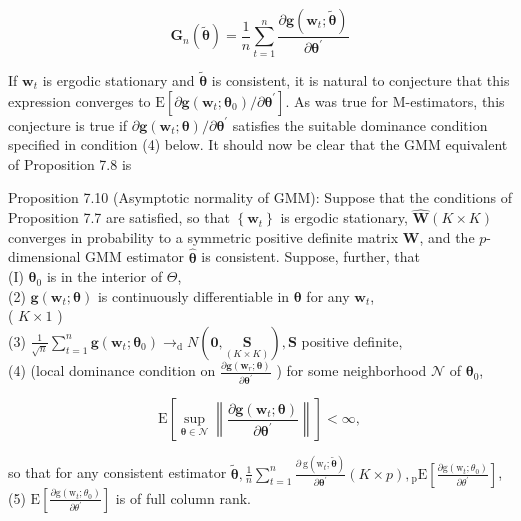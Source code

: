 \documentclass[10pt]{article}
\begin{document}
\begin{equation*}
\mathbf{G}_{n}(\tilde{\boldsymbol{\theta}})=\frac{1}{n} \sum_{t=1}^{n} \frac{\partial \mathbf{g}\left(\mathbf{w}_{t} ; \tilde{\boldsymbol{\theta}}\right)}{\partial \boldsymbol{\theta}^{\prime}} \tag{7.3.33}
\end{equation*}


If $\mathbf{w}_{t}$ is ergodic stationary and $\tilde{\boldsymbol{\theta}}$ is consistent, it is natural to conjecture that this expression converges to $\mathrm{E}\left[\partial \mathbf{g}\left(\mathbf{w}_{t} ; \boldsymbol{\theta}_{0}\right) / \partial \boldsymbol{\theta}^{\prime}\right]$. As was true for M-estimators, this conjecture is true if $\partial \mathbf{g}\left(\mathbf{w}_{t} ; \boldsymbol{\theta}\right) / \partial \boldsymbol{\theta}^{\prime}$ satisfies the suitable dominance condition specified in condition (4) below. It should now be clear that the GMM equivalent of Proposition 7.8 is

Proposition 7.10 (Asymptotic normality of GMM): Suppose that the conditions of Proposition 7.7 are satisfied, so that $\left\{\mathbf{w}_{t}\right\}$ is ergodic stationary, $\widehat{\mathbf{W}}(K \times K)$ converges in probability to a symmetric positive definite matrix $\mathbf{W}$, and the $p$-dimensional GMM estimator $\hat{\boldsymbol{\theta}}$ is consistent. Suppose, further, that\\
(I) $\boldsymbol{\theta}_{0}$ is in the interior of $\Theta$,\\
(2) $\mathbf{g}\left(\mathbf{w}_{t} ; \boldsymbol{\theta}\right)$ is continuously differentiable in $\boldsymbol{\theta}$ for any $\mathbf{w}_{t}$,\\
( $K \times 1$ )\\
(3) $\frac{1}{\sqrt{n}} \sum_{t=1}^{n} \mathbf{g}\left(\mathbf{w}_{t} ; \boldsymbol{\theta}_{0}\right) \rightarrow_{\mathrm{d}} N(\mathbf{0}, \underset{(K \times K)}{\mathbf{S}}), \mathbf{S}$ positive definite,\\
(4) (local dominance condition on $\frac{\partial \mathbf{g}\left(\mathbf{w}_{r} ; \boldsymbol{\theta}\right)}{\partial \boldsymbol{\theta}^{\prime}}$ ) for some neighborhood $\mathcal{N}$ of $\boldsymbol{\theta}_{0}$,

$$
\mathrm{E}\left[\sup _{\boldsymbol{\theta} \in \mathcal{N}}\left\|\frac{\partial \mathbf{g}\left(\mathbf{w}_{t} ; \boldsymbol{\theta}\right)}{\partial \boldsymbol{\theta}^{\prime}}\right\|\right]<\infty,
$$

so that for any consistent estimator $\tilde{\boldsymbol{\theta}}, \frac{1}{n} \sum_{t=1}^{n} \frac{\partial \mathrm{~g}\left(\mathrm{w}_{t} ; \tilde{\boldsymbol{\theta}}\right)}{\partial \boldsymbol{\theta}^{\prime}}(K \times p),{ }_{\mathrm{p}} \mathrm{E}\left[\frac{\partial \mathrm{g}\left(\mathrm{w}_{t} ; \theta_{0}\right)}{\partial \theta^{\prime}}\right]$,\\
(5) $\mathrm{E}\left[\frac{\partial \mathrm{g}\left(\mathrm{w}_{t} ; \theta_{0}\right)}{\partial \theta^{\prime}}\right]$ is of full column rank.
\end{document}
